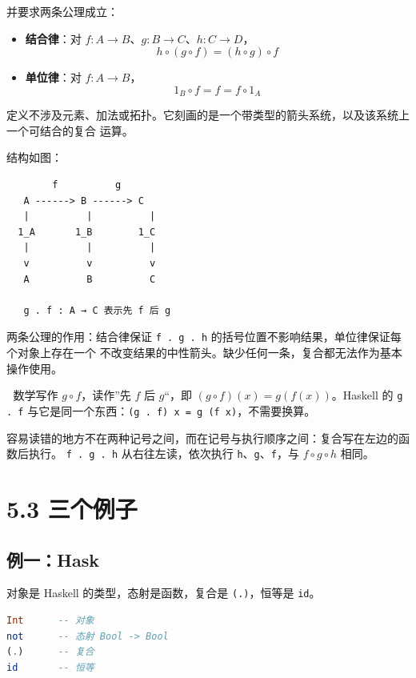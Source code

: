 并要求两条公理成立：

\begin{itemize}
\tightlist
\item
  \textbf{结合律}：对 \(f \colon A \to B\)、\(g \colon B \to C\)、\(h \colon C \to D\)，
  \[h \circ (g \circ f) = (h \circ g) \circ f\]
\item
  \textbf{单位律}：对 \(f \colon A \to B\)，
  \[1_B \circ f = f = f \circ 1_A\]
\end{itemize}

定义不涉及元素、加法或拓扑。它刻画的是一个带类型的箭头系统，以及该系统上一个可结合的复合
运算。

结构如图：

\begin{lstlisting}
        f          g
   A ------> B ------> C
   |          |          |
  1_A       1_B        1_C
   |          |          |
   v          v          v
   A          B          C

   g . f : A → C 表示先 f 后 g
\end{lstlisting}

两条公理的作用：结合律保证 \passthrough{\lstinline!f . g . h!} 的括号位置不影响结果，单位律保证每个对象上存在一个
不改变结果的中性箭头。缺少任何一条，复合都无法作为基本操作使用。

🦂 数学写作 \(g \circ f\)，读作''先 \(f\) 后 \(g\)``，即 \((g \circ f)(x) = g(f(x))\)。Haskell 的
\passthrough{\lstinline!g . f!} 与它是同一个东西：\passthrough{\lstinline!(g . f) x = g (f x)!}，不需要换算。

容易读错的地方不在两种记号之间，而在记号与执行顺序之间：复合写在左边的函数后执行。
\passthrough{\lstinline!f . g . h!} 从右往左读，依次执行 \passthrough{\lstinline!h!}、\passthrough{\lstinline!g!}、\passthrough{\lstinline!f!}，与 \(f \circ g \circ h\) 相同。

\section{5.3 三个例子}\label{ux4e09ux4e2aux4f8bux5b50}

\subsection{例一：Hask}\label{ux4f8bux4e00hask}

对象是 Haskell 的类型，态射是函数，复合是 \passthrough{\lstinline!(.)!}，恒等是 \passthrough{\lstinline!id!}。

\begin{lstlisting}[language=Haskell]
Int      -- 对象
not      -- 态射 Bool -> Bool
(.)      -- 复合
id       -- 恒等
\end{lstlisting}

